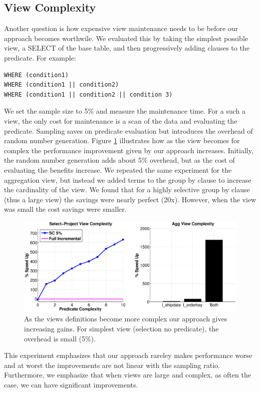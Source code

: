 \subsection{View Complexity}
Another question is how expensive view maintenance needs to be before our approach becomes worthwile.
We evaluated this by taking the simplest possible view, a SELECT of the base table, and then progressively adding clauses to the predicate.
For example:
\begin{lstlisting}
WHERE (condition1)
WHERE (condition1 || condition2)
WHERE (condition1 || condition2 || condition 3)
\end{lstlisting}
We set the sample size to 5\% and measure the maintenance time.
For a such a view, the only cost for maintenance is a scan of the data and evaluating the predicate. 
Sampling saves on predicate evaluation but introduces the overhead of random number generation.
Figure \ref{exp11overheads} illustrates how as the view becomes for complex the performance improvement given
by our approach increases.
Initially, the random number generation adds about 5\% overhead, but as the cost of evaluating the benefits increase.
We repeated the same experiment for the aggregation view, but instead we added terms to the group by clause to increase the
cardinality of the view.
We found that for a highly selective group by clause (thus a large view) the savings were nearly perfect (20x).
However, when the view was small the cost savings were smaller.
\begin{figure}[h]
\label{exp11overheads}
\centering
 \includegraphics[width=\columnwidth]{exp/complexity_efficiency_tradeoff.eps}
 \caption{As the views definitions become more complex our approach gives increasing gains. For simplest view (selection no predicate), the overhead is small (5\%). }
\end{figure}
This experiment emphasizes that our approach rareley makes performance worse and at worst the improvements are not linear with the sampling ratio.
Furthermore, we emphasize that when views are large and complex, as often the case, we can have significant improvements.

